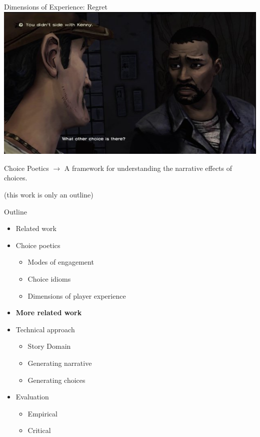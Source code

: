 \documentclass[xcolor=x11names]{beamer}
\begin{document}
\begin{frame}{Dimensions of Experience: Regret}
  \includegraphics[width=\textwidth]{res/twd-regret.jpg}
\end{frame}

\begin{frame}{Choice Poetics}
  \color{black} $\rightarrow$ A framework for understanding the narrative effects of choices. \\
  \pause
  \begin{center}
  (this work is only an outline)
  \end{center}
\end{frame}

\begin{frame}{Outline}
  \begin{itemize}
    \item Related work
    \item Choice poetics
    \begin{itemize}
      \item Modes of engagement
      \item Choice idioms
      \item Dimensions of player experience
    \end{itemize}
  \item \textbf{More related work}
    \item Technical approach
    \begin{itemize}
      \item Story Domain
      \item Generating narrative
      \item Generating choices
    \end{itemize}
    \item Evaluation
    \begin{itemize}
      \item Empirical
      \item Critical
    \end{itemize}
  \end{itemize}
\end{frame}
\end{document}

